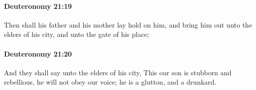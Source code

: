 		\paragraph{Deuteronomy 21:19} %
			\label{DEUTERONOMY-21-19}

			Then shall his father and his mother lay hold on him, and bring him out unto the elders of his city, and unto the gate of his place;


		\paragraph{Deuteronomy 21:20} %
			\label{DEUTERONOMY-21-20}

			And they shall say unto the elders of his city, This our son is stubborn and rebellious, he will not obey our voice; he is a glutton, and a drunkard.


